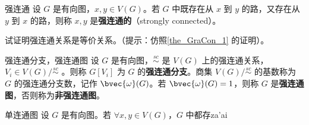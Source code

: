 \begin{definition}{强连通}
设 $G$ 是有向图，$x,y\in V(G)$。若 $G$ 中既存在从 $x$ 到 $y$ 的路，又存在从 $y$ 到 $x$ 的路，则称 $x,y$ 是\textbf{强连通的}（strongly connected）。
\end{definition}

\begin{exercise}{}
试证明强连通关系是等价关系。（提示：仿照\autoref{the_GraCon_1} 的证明）。
\end{exercise}

\begin{definition}{强连通分支，强连通图}
设 $G$ 是有向图，$\overset{sc}{\sim}$ 是 $V(G)$ 上的强连通关系，$V_i\in V(G)/\overset{sc}{\sim}$ 。则称 $G[V_i]$ 为 $G$ 的\textbf{强连通分支}。商集 $V(G)/\overset{sc}{\sim}$ 的基数称为 $G$ 的强连通分支数，记作 $\bvec{\omega}(G)$。若 $\bvec{\omega}(G)=1$，则称 $G$ 是\textbf{强连通图}，否则称为\textbf{非强连通图}。
\end{definition}

\begin{definition}{单连通图}
设 $G$ 是有向图。若 $\forall x,y\in V(G)$，$G$ 中都存za'ai
\end{definition}










